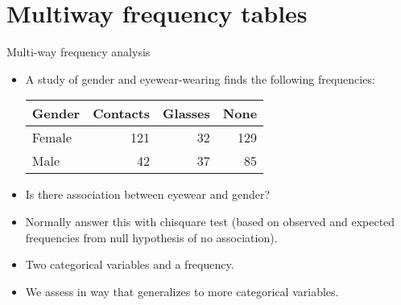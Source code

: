\section{Multiway frequency tables}
\frame{\sectionpage}


\begin{frame}[fragile]{Multi-way frequency analysis}

  \begin{itemize}
  \item A study of gender and eyewear-wearing finds the following frequencies:

    \begin{tabular}{lrrr}
      \hline
      Gender & Contacts & Glasses & None \\
      \hline
      Female & 121 & 32 & 129 \\
      Male & 42 & 37 & 85\\
      \hline
    \end{tabular}


  \item Is there association between eyewear and gender?
  \item Normally answer this with chisquare test (based on observed and expected frequencies from null hypothesis of no association).
  \item Two categorical variables and a frequency.
  \item We assess in way that generalizes to more categorical variables.

  \end{itemize}

\end{frame}


